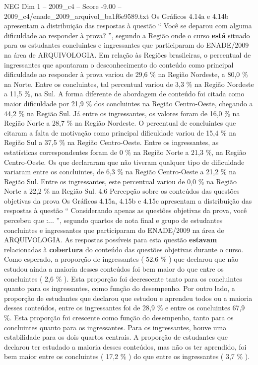 \begin{textsample}{NEG Dim 1 – 2009\_c4 – Score -9.00 – 2009\_c4/enade\_2009\_arquivol\_ba1f6e9589.txt}
Os Gráficos 4.14a e 4.14b apresentam a distribuição das respostas à questão “ Você se deparou com alguma dificuldade ao responder à prova? ”, segundo a Região onde o curso \textbf{está} situado para os estudantes concluintes e ingressantes que participaram do ENADE/2009 na área de ARQUIVOLOGIA.
Em relação às Regiões brasileiras, o percentual de ingressantes que apontaram o desconhecimento do conteúdo como principal dificuldade ao responder à prova variou de 29,6 \% na Região Nordeste, a 80,0 \% na Norte.
Entre os concluintes, tal percentual variou de 3,3 \% na Região Nordeste a 11,5 \%, na Sul.
A forma diferente de abordagem de conteúdo foi citada como maior dificuldade por 21,9 \% dos concluintes na Região Centro-Oeste, chegando a 44,2 \% na Região Sul.
Já entre os ingressantes, os valores foram de 16,0 \% na Região Norte a 28,7 \% na Região Nordeste.
O percentual de concluintes que citaram a falta de motivação como principal dificuldade variou de 15,4 \% na Região Sul a 37,5 \% na Região Centro-Oeste.
Entre os ingressantes, as estatísticas correspondentes foram de 0 \% na Região Norte a 21,3 \%, na Região Centro-Oeste.
Os que declararam que não tiveram qualquer tipo de dificuldade variaram entre os concluintes, de 6,3 \% na Região Centro-Oeste a 21,2 \% na Região Sul.
Entre os ingressantes, este percentual variou de 0,0 \% na Região Norte a 22,2 \% na Região Sul. 4.6 Percepção sobre os conteúdos das questões objetivas da prova Os Gráficos 4.15a, 4.15b e 4.15c apresentam a distribuição das respostas à questão “ Considerando apenas as questões objetivas da prova, você percebeu que :... ”, segundo quartos de nota final e grupo de estudantes concluintes e ingressantes que participaram do ENADE/2009 na área de ARQUIVOLOGIA.
As respostas possíveis para esta questão \textbf{estavam} relacionadas à \textbf{cobertura} do conteúdo das questões objetivas durante o curso.
Como esperado, a proporção de ingressantes ( 52,6 \% ) que declarou que não estudou ainda a maioria desses conteúdos foi bem maior do que entre os concluintes ( 2,6 \% ).
Esta proporção foi decrescente tanto para os concluintes quanto para os ingressantes, como função do desempenho.
Por outro lado, a proporção de estudantes que declarou que estudou e aprendeu todos ou a maioria desses conteúdos, entre os ingressantes foi de 28,9 \% e entre os concluintes 67,9 \%.
Esta proporção foi crescente como função do desempenho, tanto para os concluintes quanto para os ingressantes.
Para os ingressantes, houve uma estabilidade para os dois quartos centrais.
A proporção de estudantes que declarou ter estudado a maioria desses conteúdos, mas não os ter aprendido, foi bem maior entre os concluintes ( 17,2 \% ) do que entre os ingressantes ( 3,7 \% ).

\end{textsample}
